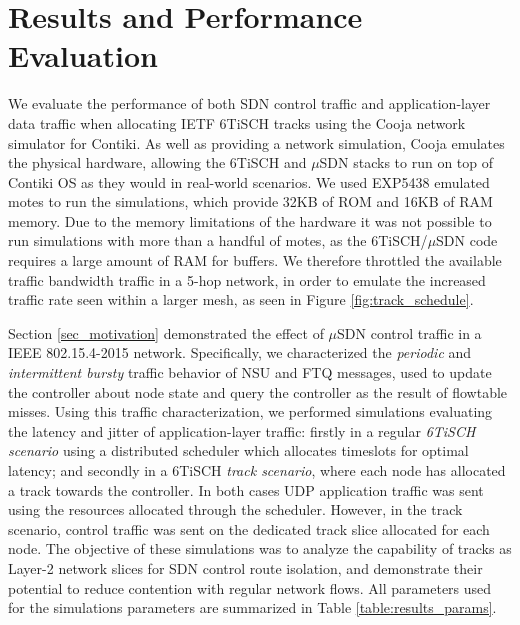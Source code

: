 \section{Results and Performance Evaluation}
\label{sec_results}

We evaluate the performance of both SDN control traffic and application-layer data traffic when allocating IETF 6TiSCH tracks using the Cooja network simulator for Contiki. As well as providing a network simulation, Cooja emulates the physical hardware, allowing the 6TiSCH and $\mu$SDN stacks to run on top of Contiki OS as they would in real-world scenarios. We used EXP5438 emulated motes to run the simulations, which provide 32KB of ROM and 16KB of RAM memory. Due to the memory limitations of the hardware it was not possible to run simulations with more than a handful of motes, as the 6TiSCH/$\mu$SDN code requires a large amount of RAM for buffers. We therefore throttled the available traffic bandwidth traffic in a 5-hop network, in order to emulate the increased traffic rate seen within a larger mesh, as seen in Figure \ref{fig:track_schedule}.

Section \ref{sec_motivation} demonstrated the effect of $\mu$SDN control traffic in a IEEE 802.15.4-2015 network. Specifically, we characterized the \textit{periodic} and \textit{intermittent bursty} traffic behavior of NSU and FTQ messages, used to update the controller about node state and query the controller as the result of flowtable misses. Using this traffic characterization, we performed simulations evaluating the latency and jitter of application-layer traffic: firstly in a regular \textit{6TiSCH scenario} using a distributed scheduler which allocates timeslots for optimal latency; and secondly in a 6TiSCH \textit{track scenario}, where each node has allocated a track towards the controller. In both cases UDP application traffic was sent using the resources allocated through the scheduler. However, in the track scenario, control traffic was sent on the dedicated track slice allocated for each node. The objective of these simulations was to analyze the capability of tracks as Layer-2 network slices for SDN control route isolation, and demonstrate their potential to reduce contention with regular network flows. All parameters used for the simulations parameters are summarized in Table \ref{table:results_params}.

